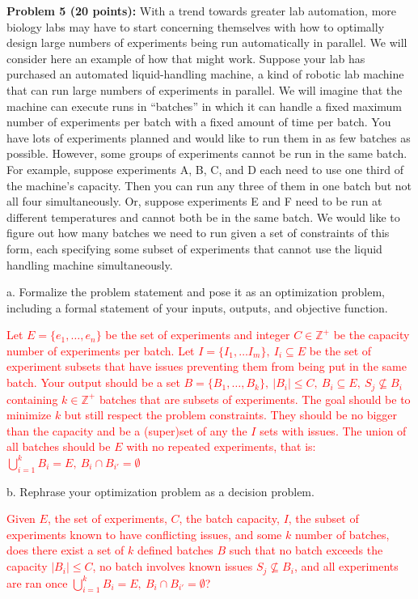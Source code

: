 \documentclass[11pt]{article}
\begin{document}
{\bf *Problem 5 (20 points):} With a trend towards greater lab automation, 
more biology labs may have to start concerning themselves with how to
optimally design large numbers of experiments being run automatically
in parallel.  We will consider here an example of how that might work.
Suppose your lab has purchased an automated liquid-handling machine, a
kind of robotic lab machine that can run large numbers of experiments in
parallel.  We will imagine that the machine can execute runs in ``batches''
 in which it can handle a fixed maximum number
of experiments per batch with a fixed amount of time per batch.  You
have lots of experiments planned and would like to run them in as few
batches as possible.  However, some groups of experiments cannot be
run in the same batch.  For example, suppose experiments A, B, C, and
D each need to use one third of the machine's capacity.  Then you can run any
three of them in one batch but not all four simultaneously.  Or,
suppose experiments E and F need to be run at different temperatures
and cannot both be in the same batch.  We would like to figure out how
many batches we need to run given a set of constraints of this form,
each specifying some subset of experiments that cannot use the liquid
handling machine
simultaneously.

a. Formalize the problem statement and pose it as an optimization
problem, including a formal statement of your inputs, outputs, and
objective function.

\textcolor{red}{
Let $E = \{e_1, \ldots, e_n\}$ be the set of experiments and integer $C \in \mathbb{Z}^+$ be the capacity number of experiments per batch. Let $I = \{I_1, \ldots I_m\},\ I_i \subseteq E$ be the set of experiment subsets that have issues preventing them from being put in the same batch. Your output should be a set $B = \{B_1, \ldots, B_k\},\ |B_i| \le C,\ B_i \subseteq E,\ S_j \nsubseteq B_i$ containing $k \in \mathbb{Z}^+$ batches that are subsets of experiments. The goal should be to minimize $k$ but still respect the problem constraints. They should be no bigger than the capacity and be a (super)set of any the $I$ sets with issues. The union of all batches should be $E$ with no repeated experiments, that is: $\bigcup_{i=1}^k B_i = E,\ B_i \cap B_{i'} = \emptyset$}

b. Rephrase your optimization problem as a decision problem.

\textcolor{red}{
Given $E$, the set of experiments, $C$, the batch capacity, $I$, the subset of experiments known to have conflicting issues, and some $k$ number of batches, does there exist a set of $k$ defined batches $B$ such that no batch exceeds the capacity $|B_i| \le C$, no batch involves known issues $S_j \nsubseteq B_i$, and all experiments are ran once $\bigcup_{i=1}^k B_i = E,\ B_i \cap B_{i'} = \emptyset$?
}
\end{document}

